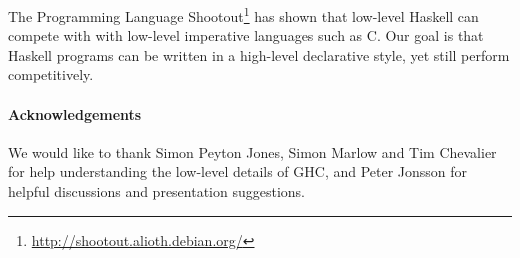 \documentclass{llncs}
\begin{document}
The Programming Language Shootout\footnote{\url{http://shootout.alioth.debian.org/}} has shown that low-level Haskell can compete with with low-level imperative languages such as C. Our goal is that Haskell programs can be written in a high-level declarative style, yet still perform competitively.

\paragraph{Acknowledgements} We would like to thank Simon Peyton Jones, Simon Marlow and Tim Chevalier for help understanding the low-level details of GHC, and Peter Jonsson for helpful discussions and presentation suggestions.




\end{document}
